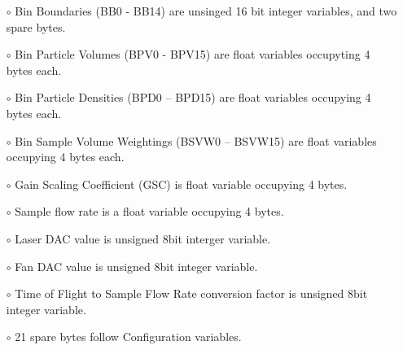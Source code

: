 \begin{itemize}
\setlength\itemsep{0em}
\item[$\circ$] Bin Boundaries (BB0 - BB14) are unsinged 16 bit integer variables, and two spare bytes.
\item[$\circ$] Bin Particle Volumes (BPV0 - BPV15) are float variables occupyting 4 bytes each.
\item[$\circ$] Bin Particle Densities (BPD0 -- BPD15) are float variables occupying 4 bytes each.
\item[$\circ$] Bin Sample Volume Weightings (BSVW0 -- BSVW15) are float variables occupying 4 bytes each.
\item[$\circ$] Gain Scaling Coefficient (GSC) is float variable occupying 4 bytes.
\item[$\circ$] Sample flow rate is a float variable occupying 4 bytes.
\item[$\circ$] Laser DAC value is unsigned 8bit interger variable.
\item[$\circ$] Fan DAC value is unsigned 8bit integer variable.
\item[$\circ$] Time of Flight to Sample Flow Rate conversion factor is unsigned 8bit integer variable.
\item[$\circ$] 21 spare bytes follow Configuration variables.
\end{itemize}


\makeatletter
\setlength{\@fptop}{0pt}
\makeatother

\clearpage